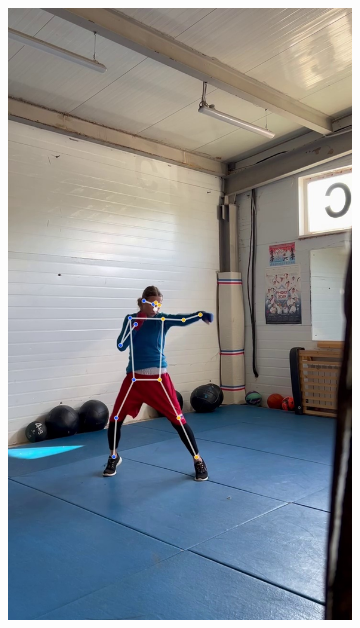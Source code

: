 \begin{figure}[h]
\begin{subfigure}[b]{0.24\textwidth}
	\includegraphics[width=\textwidth]{./images/data_info/box_examples/ex_1}
\end{subfigure}
\begin{subfigure}[b]{0.24\textwidth}
	\centering

\end{subfigure}
\end{figure}
